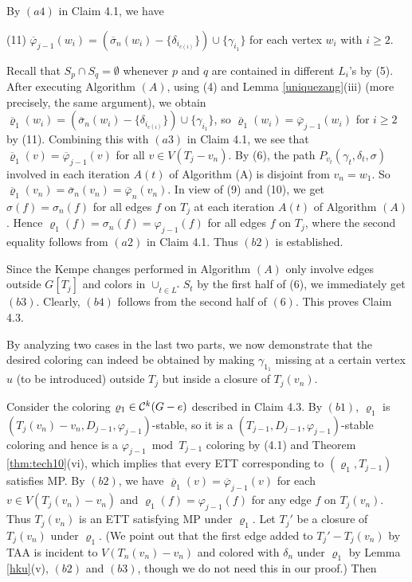 \documentclass[11pt]{article}
\newcommand{\phibar}{\overline{\varphi}}
\newcommand{\phiv}{\varphi}
\begin{document}
By $(a4)$ in Claim 4.1, we have

(11) $\phibar_{j-1}(w_i)= (\overline{\sigma}_n(w_i)- \{\delta_{i_{c(i)}}\}) \cup \{\gamma_{i_1}\}$ for each vertex $w_i$ with $i\ge 2$.

Recall that $S_p \cap S_q =\emptyset$ whenever $p$ and $q$ are contained in different $L_i$'s by (5). After executing Algorithm $(A)$, 
using (4) and Lemma \ref{uniquezang}(iii) (more precisely, the same argument), we obtain $\overline{\varrho}_1(w_i)=(\overline{\sigma}_n(w_i)-\{\delta_{i_{c(i)}}\}) 
\cup  \{\gamma_{i_1}\}$, so $\overline{\varrho}_1(w_i)=\phibar_{j-1}(w_i)$ for $i\ge 2$ by (11). Combining this with $(a3)$ in 
Claim 4.1, we see that $\overline{\varrho}_1 (v)=\phibar_{j-1}(v)$ for all $v\in V(T_j-v_n)$. By (6), the 
path $P_{v_t}(\gamma_t, \delta_t, \sigma)$ involved in each iteration $A(t)$ of Algorithm (A) is disjoint from
$v_n=w_1$. So $\overline{\varrho}_1(v_n)= \overline{\sigma}_n(v_n)=\phibar_n(v_n)$. In view of (9) and (10), we get 
$\sigma(f) = \sigma_n(f)$ for all edges $f$ on $T_j$ at each iteration $A(t)$ of Algorithm $(A)$.  Hence $\varrho_1(f)
=\sigma_n(f) =\varphi_{j-1}(f)$ for all edges $f$ on $T_j$, where the second equality follows from $(a2)$ in Claim 4.1.
Thus $(b2)$ is established.

Since the Kempe changes performed in Algorithm $(A)$ only involve edges outside $G[T_j]$ and colors in $\cup_{t\in L^*} S_t$ by the first half
of (6), we immediately get $(b3)$. Clearly, $(b4)$ follows from the second half of $(6)$. This proves Claim 4.3. 

\vskip 2mm
By analyzing two cases in the last two parts, we now demonstrate that the desired coloring can indeed be obtained by making $\gamma_{1_1}$ missing 
at a certain vertex $u$ (to be introduced) outside $T_j$ but inside a closure of $T_{j}(v_n)$. 

Consider the coloring $\varrho_1 \in {\cal C}^k(G-e)$ described in Claim 4.3.  By $(b1)$, $\varrho_1$ is $(T_j(v_n)-v_n,D_{j-1},
\varphi_{j-1})$-stable, so it is a $(T_{j-1},D_{j-1},\varphi_{j-1})$-stable coloring and hence is a $\phiv_{j-1}\bmod T_{j-1}$ coloring by
(4.1) and Theorem \ref{thm:tech10}(vi), which implies that every ETT corresponding to $(\varrho_1, T_{j-1})$ satisfies MP.  By $(b2)$, we have 
$\overline{\varrho}_1(v)=\phibar_{j-1}(v)$ for each $v\in V(T_j(v_n)-v_n)$ and $\varrho_1(f)=\varphi_{j-1}(f)$ 
for any edge $f$ on $T_j(v_n)$. Thus $T_j(v_n)$ is an ETT satisfying MP under $\varrho_1$. Let $T_j'$ be a closure of $T_{j}(v_n)$ under $\varrho_1$. 
(We point out that the first edge added to $T_j'-T_{j}(v_n)$ by TAA is incident to $V(T_n(v_n)-v_n)$ and colored with 
$\delta_n$ under $\varrho_1$ by Lemma \ref{hku}(v), $(b2)$ and $(b3)$, though we do not need this in our proof.) 
Then 
\end{document}
